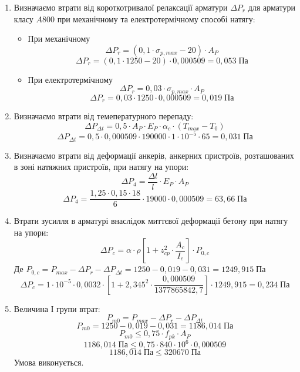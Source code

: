 \documentclass[a4paper,14pt]{article}
\begin{document}
\begin{enumerate}
    \item Визначаємо втрати від короткотривалої релаксації арматури $\Delta P_r$ для арматури класу $A800$ при механічному та електротермічному способі натягу:
        \begin{itemize}
            \item При механічному
                \begin{equation}
                    \Delta P_r = (0,1 \cdot \sigma_{p,max} - 20) \cdot A_P
                \end{equation}
                $$\Delta P_r = (0,1 \cdot 1250 - 20) \cdot 0,000509 = 0,053\;\textit{Па}$$
            \item При електротермічному
                \begin{equation}
                    \Delta P_r = 0,03 \cdot \sigma_{p,max} \cdot A_P
                \end{equation}
                $$\Delta P_r = 0,03 \cdot 1250 \cdot 0,000509 = 0,019\;\textit{Па}$$
        \end{itemize}
    \item Визначаємо втрати від темепературного перепаду:
        \begin{equation}
            \Delta P_{\Delta t} = 0,5 \cdot A_P \cdot E_P \cdot \alpha_c \cdot (T_{max} - T_0)
        \end{equation}
        $$\Delta P_{\Delta t} = 0,5 \cdot 0,000509 \cdot 190000 \cdot 1 \cdot 10^{-5} \cdot 65 = 0,031\;\textit{Па}$$
    \item Визначаємо втрати від деформації анкерів, анкерних пристроїв, розташованих в зоні натяжних пристроїв, при натягу на упори:
        \begin{equation}
            \Delta P_4 = \dfrac{\Delta l}{l} \cdot E_P \cdot A_P
        \end{equation}
        $$\Delta P_4 = \dfrac{1,25 \cdot 0,15 \cdot 18}{6} \cdot 19000 \cdot 0,000509 = 63,66\;\textit{Па}$$
    \item Втрати зусилля в арматурі внаслідок миттєвої деформації бетону при натягу на упори:
        \begin{equation}
            \Delta P_c = \alpha \cdot \rho \left[1 + z_{cp}^2 \cdot \dfrac{A_c}{I_c}\right] \cdot P_{0,c}
        \end{equation}
        Де $P_{0,c} = P_{max} - \Delta P_r - \Delta P_{\Delta t} = 1250 - 0,019 - 0,031 = 1249,915\;\textit{Па}$
        $$\Delta P_c = 1 \cdot 10^{-5} \cdot 0,0032 \cdot \left[1 + 2,345^2 \cdot \dfrac{0,000509}{1377865842,7}\right] \cdot 1249,915 = 0,234\;\textit{Па}$$
    \item Величина І групи втрат:
        \begin{equation}
            P_{m0} = P_{max} - \Delta P_r - \Delta P_{\Delta t}
        \end{equation}
        $$P_{m0} = 1250 - 0,019 - 0,031  = 1186,014\;\textit{Па}$$
        $$P_{m0} \leq 0,75 \cdot f_{pk} \cdot A_P$$
        $$1186,014\;\textit{Па} \leq 0,75 \cdot 840 \cdot 10^6 \cdot 0,000509$$
        $$1186,014\;\textit{Па} \leq 320670\;\textit{Па}$$
        Умова виконується.
\end{enumerate}
    
\end{document}
